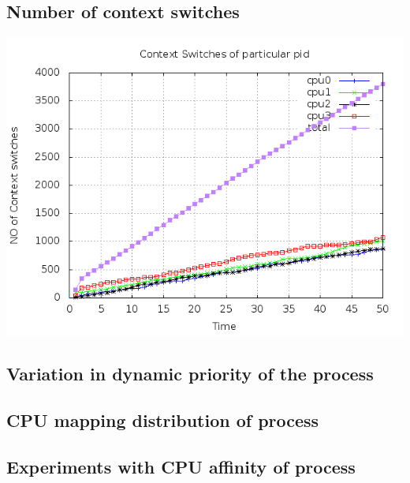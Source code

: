 \documentclass[a4paper,11pt]{report}
\begin{document}
 \subsection{Number of context switches}
 \includegraphics[scale=0.6]{pidcs.png}
 
 \subsection{Variation in dynamic priority of the process}
 \subsection{CPU mapping distribution of process}
 \subsection{Experiments with CPU affinity of process}
\end{document}
